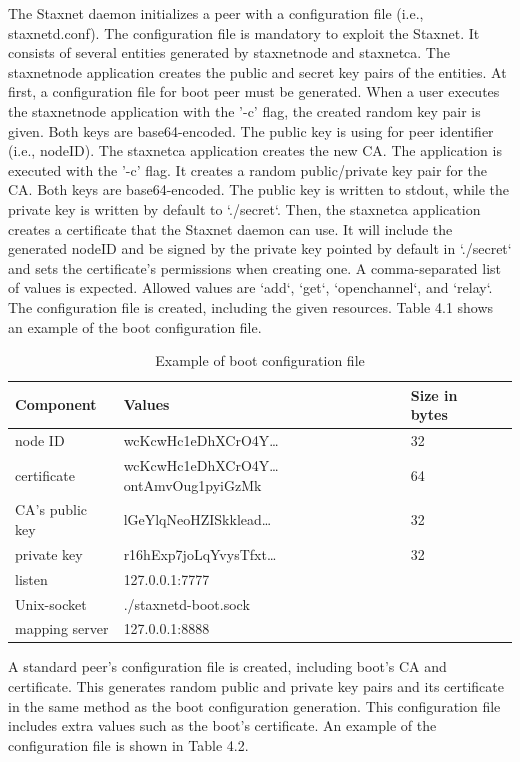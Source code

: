 The Staxnet daemon initializes a peer with a configuration file (i.e., staxnetd.conf). 
The configuration file is mandatory to exploit the Staxnet. It consists of several entities generated by staxnetnode and staxnetca. The staxnetnode application creates the public and secret key pairs of the entities. At first, a configuration file for boot peer must be generated. When a user executes the staxnetnode application with the '-c' flag, the created random key pair is given. Both keys are base64-encoded. The public key is using for peer identifier (i.e., nodeID). The staxnetca application creates the new CA. The application is executed with the '-c' flag. It creates a random public/private key pair for the CA. Both keys are base64-encoded. The public key is written to stdout, while the private key is written by default to `./secret`. Then, the staxnetca application creates a certificate that the Staxnet daemon can use. It will include the generated nodeID and be signed by the private key pointed by default in `./secret` and sets the certificate's permissions when creating one. A comma-separated list of values is expected. Allowed values are `add`, `get`, `openchannel`, and `relay`. The configuration file is created, including the given resources. Table 4.1 shows an example of the boot configuration file.

\begin{table}[!ht]
	\small
	\centering
	\begin{tabular}{|l|l|l|l|}
		\hline
		Component & Values & Size in bytes \\
		\hline
		node ID & wcKcwHc1eDhXCrO4Y… & 32 \\
		\hline
		certificate & wcKcwHc1eDhXCrO4Y… ontAmvOug1pyiGzMk & 64 \\
		\hline
		CA’s public key & lGeYlqNeoHZISkklead… & 32 \\
		\hline
		private key & r16hExp7joLqYvysTfxt… & 32 \\
		\hline
		listen & 127.0.0.1:7777 &  \\
		\hline
		Unix-socket & ./staxnetd-boot.sock &  \\
		\hline
		mapping server & 127.0.0.1:8888 & \\
		\hline
	\end{tabular}
	\caption{Example of boot configuration file}
\end{table}

A standard peer's configuration file is created, including boot's CA and certificate. This generates random public and private key pairs and its certificate in the same method as the boot configuration generation. This configuration file includes extra values such as the boot's certificate. An example of the configuration file is shown in Table 4.2.

